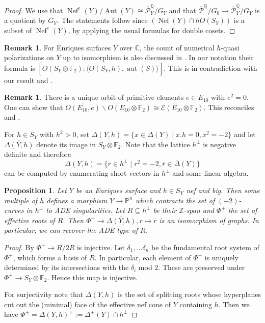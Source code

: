 \documentclass{amsart}
\theoremstyle{definition}
\newtheorem{remark}[definition]{Remark}
\theoremstyle{plain}
\newtheorem{proposition}[definition]{Proposition}
\DeclareMathOperator{\Nef}{Nef}
\DeclareMathOperator{\Aut}{Aut}
\DeclareMathOperator{\aut}{aut}
\newcommand{\FF}{\mathbb{F}}
\newcommand{\ZZ}{\mathbb{Z}}
\newcommand{\E}{\mathcal{E}}
\renewcommand{\P}{\mathcal{P}}
\newcommand{\Gbar}{\overline{G}}
\newcommand{\Pbar}{\overline{\P}^\mathbb{Q}}
\begin{document}
\begin{proof}
We use that $\Nef^e(Y)/\Aut(Y) \cong \Pbar_Y/G_Y$ and that
$\Pbar/G_0 \to \Pbar_Y/G_Y$ is a quotient by $\Gbar_Y$.
The statements follow since $\left(\Nef(Y)\cap hO(S_Y)\right)$ is a subset of $\Nef^e(Y)$, by applying the usual formulas for double cosets.
\end{proof}
\begin{remark}
For Enriques surfaces $Y$ over $\mathbb{C}$, the count of numerical $h$-quasi polarizations on $Y$ up to isomorphism is also discussed in \cite[(5.7.1)]{cdl:enriquesI}.
In our notation their formula is
$\left[O(S_Y \otimes \FF_2): \langle\overline{O(S_Y,h)}, \aut(S)\rangle\right]$.
This is in contradiction with our result and \cite[Table 8.3]{enriquesII}.
\end{remark}
\begin{remark}
 There is a unique orbit of primitive elements $e \in E_{10}$ with $e^2=0$. One can show that
 $\overline{O(E_{10},e)} \backslash O(E_{10}\otimes \FF_2) \cong \E(E_{10}\otimes \FF_2)$.
 This reconciles  and .
\end{remark}

For $h \in S_Y$ with $h^2>0$, set $\Delta(Y,h) = \{x \in \Delta(Y) \mid x.h=0, x^2=-2\}$ and let $\overline{\Delta(Y,h)}$ denote its image in $S_Y \otimes \FF_2$.
Note that the lattice $h^\perp$ is negative definite and therefore
\[\Delta(Y,h)=\{r \in h^\perp \mid r^2 = -2, \overline{r} \in \overline{\Delta}(Y)\}\]
can be computed by enumerating short vectors in $h^\perp$ and some linear algebra.
\begin{proposition}
    Let $Y$ be an Enriques surface and $h \in S_Y$ nef and big.
    Then some multiple of $h$ defines a morphism $Y \to \mathbb{P}^n$
    which contracts the set of $\left(-2\right)$-curves in $h^\perp$ to ADE singularities.
    Let $R \subseteq h^\perp$ be their $\ZZ$-span and $\Phi^+$ the set of effective roots of $R$. Then $\Phi^+ \to \overline{\Delta(Y,h)}, r\mapsto \overline{r}$ is an isomorphism of graphs.
    In particular, we can recover the ADE type of $R$.
\end{proposition}
\begin{proof}
By \cite[Lemma 3.8]{brandhorst_shimada:tautaubar} $\Phi^+ \to R/2R$ is injective. Let $\delta_1,\dots \delta_n$ be the fundamental root system of $\Phi^+$, which forms a basis of $R$. In particular, each element of $\Phi^+$ is uniquely determined by its intersections with the $\delta_i$ mod $2$. These are preserved under $
\Phi^+ \to S_Y\otimes \FF_2$. Hence this map is injective.

For surjectivity note that $\Delta(Y,h)$ is the set of splitting roots whose hyperplanes cut out the (minimal) face of the effective nef cone of $Y$ containing $h$. Then we have $\Phi^+=\Delta(Y, h)^+:=\Delta^+(Y)\cap h^\perp$
\end{proof}
\end{document}
